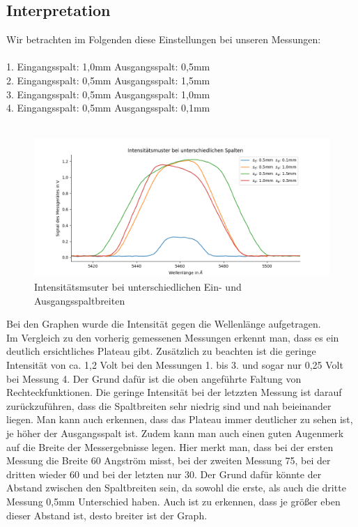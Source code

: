 \subsection* {Interpretation} 
Wir betrachten im Folgenden diese Einstellungen bei unseren Messungen:\\\\
1. Eingangsspalt: 1,0mm \tab Ausgangsspalt: 0,5mm\\
2. Eingangsspalt: 0,5mm \tab Ausgangsspalt: 1,5mm\\
3. Eingangsspalt: 0,5mm \tab Ausgangsspalt: 1,0mm\\
4. Eingangsspalt: 0,5mm \tab Ausgangsspalt: 0,1mm\\
 \\
\begin{figure}[h]
    \centering
    \includegraphics[width = \linewidth]{Bilder/A5FaltungSpalte.png}
    \caption{Intensitätsmsuter bei unterschiedlichen Ein- und Ausgangsspaltbreiten}
\end{figure}
Bei den Graphen wurde die Intensit\"at gegen die Wellenl\"ange aufgetragen. \\
Im Vergleich zu den vorherig gemessenen Messungen erkennt man, dass es ein deutlich ersichtliches Plateau gibt.
Zus\"atzlich zu beachten ist die geringe Intensit\"at von ca. 1,2 Volt bei den Messungen 1. bis 3. und sogar nur 0,25 Volt bei Messung 4. Der Grund daf\"ur ist die oben angef\"uhrte Faltung von 
Rechteckfunktionen. Die geringe Intensit\"at bei der letzzten Messung ist darauf zur\"uckzuf\"uhren, dass die Spaltbreiten sehr niedrig sind und nah beieinander liegen. Man kann auch erkennen, dass das 
Plateau immer deutlicher zu sehen ist, je h\"oher der Ausgangsspalt ist. Zudem kann man auch einen guten Augenmerk auf die Breite der Messergebnisse legen. Hier merkt man, dass bei der ersten Messung die 
Breite 60 Angstr\"om misst, bei der zweiten Messung 75, bei der dritten wieder 60 und bei der letzten nur 30. Der Grund daf\"ur k\"onnte der Abstand zwischen den Spaltbreiten sein, da sowohl die erste, 
als auch die dritte Messung 0,5mm Unterschied haben. Auch ist zu erkennen, dass je gr\"o\ss{}er eben dieser Abstand ist, desto breiter ist der Graph. \\








